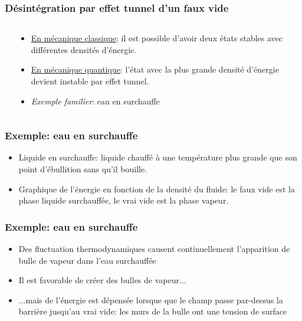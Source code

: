 \documentclass{beamer}
\begin{document}
\begin{frame}
\frametitle{Désintégration par effet tunnel d'un faux vide}
     \begin{columns}[t] %
     \begin{column}[T]{3cm} %
     \end{column}
     \begin{column}[T]{7cm}
     \begin{itemize}
     \item<2-> \underline{En mécanique classique}: il est possible d'avoir deux états stables avec différentes densités d'énergie.
     \item<2-> \underline{En mécanique quantique}: l'état avec la plus grande densité d'énergie devient instable par effet tunnel.
     \item<3-> \textit{Exemple familier}: eau en surchauffe
     \end{itemize}
     \end{column}
     \end{columns}
\end{frame}

\begin{frame}
\frametitle{Exemple: eau en surchauffe}
\begin{figure}
\end{figure}
\begin{itemize}
\item Liquide en surchauffe: liquide chauffé à une température plus grande que son point d'ébullition sans qu'il bouille.
\item Graphique de l'énergie en fonction de la densité du fluide: le faux vide est la phase liquide surchauffée, le vrai vide est la phase vapeur.
\end{itemize}
\end{frame}


\begin{frame}
\frametitle{Exemple: eau en surchauffe}
\begin{figure}
\end{figure}
\begin{itemize}
\item Des fluctuation thermodynamiques causent continuellement l'apparition de bulle de vapeur dans l'eau surchauffée
\item Il est favorable de créer des bulles de vapeur...
\item ...mais de l'énergie est dépensée lorsque que le champ passe par-dessus la barrière jusqu'au vrai vide: les murs de la bulle ont une tension de surface
\end{itemize}
\end{frame}
\end{document}
